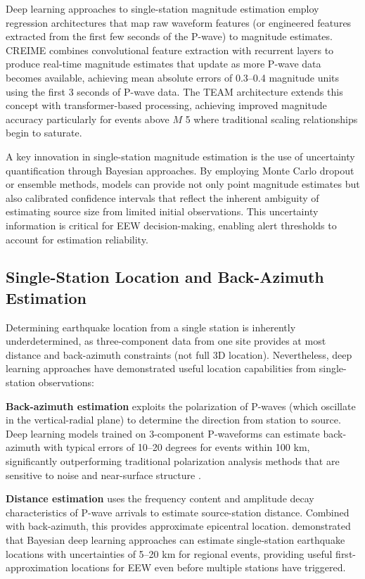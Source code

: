 \documentclass[review,authoryear]{elsarticle}
\begin{document}
Deep learning approaches to single-station magnitude estimation employ regression architectures that map raw waveform features (or engineered features extracted from the first few seconds of the P-wave) to magnitude estimates. CREIME \citep{bilal2022creime} combines convolutional feature extraction with recurrent layers to produce real-time magnitude estimates that update as more P-wave data becomes available, achieving mean absolute errors of 0.3--0.4 magnitude units using the first 3 seconds of P-wave data. The TEAM architecture \citep{munchmeyer2021team} extends this concept with transformer-based processing, achieving improved magnitude accuracy particularly for events above $M$ 5 where traditional scaling relationships begin to saturate.

A key innovation in single-station magnitude estimation is the use of uncertainty quantification through Bayesian approaches. By employing Monte Carlo dropout \citep{gal2016dropout} or ensemble methods, models can provide not only point magnitude estimates but also calibrated confidence intervals that reflect the inherent ambiguity of estimating source size from limited initial observations. This uncertainty information is critical for EEW decision-making, enabling alert thresholds to account for estimation reliability.

\subsection{Single-Station Location and Back-Azimuth Estimation}

Determining earthquake location from a single station is inherently underdetermined, as three-component data from one site provides at most distance and back-azimuth constraints (not full 3D location). Nevertheless, deep learning approaches have demonstrated useful location capabilities from single-station observations:

\textbf{Back-azimuth estimation} exploits the polarization of P-waves (which oscillate in the vertical-radial plane) to determine the direction from station to source. Deep learning models trained on 3-component P-waveforms can estimate back-azimuth with typical errors of 10--20 degrees for events within 100 km, significantly outperforming traditional polarization analysis methods that are sensitive to noise and near-surface structure \citep{lomax2019investigation}.

\textbf{Distance estimation} uses the frequency content and amplitude decay characteristics of P-wave arrivals to estimate source-station distance. Combined with back-azimuth, this provides approximate epicentral location. \citet{mousavi2019bayesian} demonstrated that Bayesian deep learning approaches can estimate single-station earthquake locations with uncertainties of 5--20 km for regional events, providing useful first-approximation locations for EEW even before multiple stations have triggered.
\end{document}

